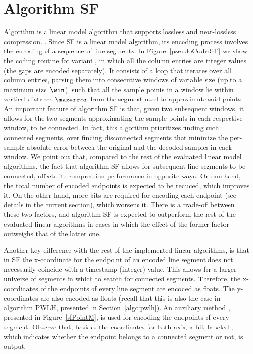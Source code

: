 

\vspace{-8pt}
\section{Algorithm SF}
\label{algo:sf}


\vspace{-8pt}
Algorithm \textit{\SFfull} \cite{coder:sf} is a linear model algorithm that supports lossless and near-lossless compression. \WindowParam {}. Since SF is a linear model algorithm, its encoding process involves the encoding of a sequence of line segments. In Figure~\ref{pseudoCoderSF} we show the coding routine for variant \maskalgo, in which all the column entries are integer values (the gaps are encoded separately). It consists of a loop that iterates over all column entries, parsing them into consecutive windows of variable size (up to a maximum size~$\win$), such that all the sample points in a window lie within vertical distance $\maxerror$ from the segment used to approximate said points. An important feature of algorithm SF is that, given two subsequent windows, it allows for the two segments approximating the sample points in each respective window, to be connected. In fact, this algorithm prioritizes finding such connected segments, over finding disconnected segments that minimize the per-sample absolute error between the original and the decoded samples in each window. We point out that, compared to the rest of the evaluated linear model algorithms, the fact that algorithm SF allows for subsequent line segments to be connected, affects its compression performance in opposite ways. On one hand, the total number of encoded endpoints is expected to be reduced, which improves it. On the other hand, more bits are required for encoding each endpoint (see details in the current section), which worsens it. There is a trade-off between these two factors, and algorithm SF is expected to outperform the rest of the evaluated linear algorithms in cases in which the effect of the former factor outweighs that of the latter one.





\clearpage


Another key difference with the rest of the implemented linear algorithms, is that in SF the x-coordinate for the endpoint of an encoded line segment does not necessarily coincide with a timestamp (integer) value. This allows for a larger universe of segments in which to search for connected segments. Therefore, the x-coordinates of the endpoints of every line segment are encoded as floats. The y-coordinates are also encoded as floats (recall that this is also the case in algorithm PWLH, presented in Section~\ref{algo:pwlh}). An auxiliary method \SFEncodePoint, presented in Figure~\ref{sfPointM}, is used for encoding the endpoints of every segment. Observe that, besides the coordinates for both axis, a bit, labeled \connectedS, which indicates whether the endpoint belongs to a connected segment or not, is output.


